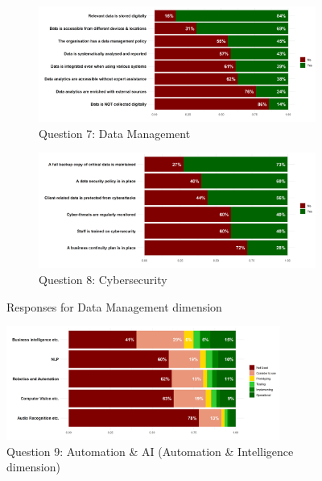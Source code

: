 \documentclass[12pt]{report}
\begin{document}
\begin{figure}
    \centering
    \begin{subfigure}[b]{0.8\textwidth}
        \centering
        \includegraphics[width=\linewidth]{../Output/q7.png}
        \caption{Question 7: Data Management}
    \end{subfigure}
    \vfill
    \begin{subfigure}[b]{0.8\textwidth}
        \centering
        \includegraphics[width=\linewidth]{../Output/q8.png}
        \caption{Question 8: Cybersecurity}
    \end{subfigure}
    \caption{Responses for Data Management dimension}
\end{figure}

\begin{figure}
    \centering
    \includegraphics[width=0.8\textwidth]{../Output/q9.png}
    \caption{Question 9: Automation \& AI (Automation \& Intelligence dimension)}
\end{figure}
\end{document}
